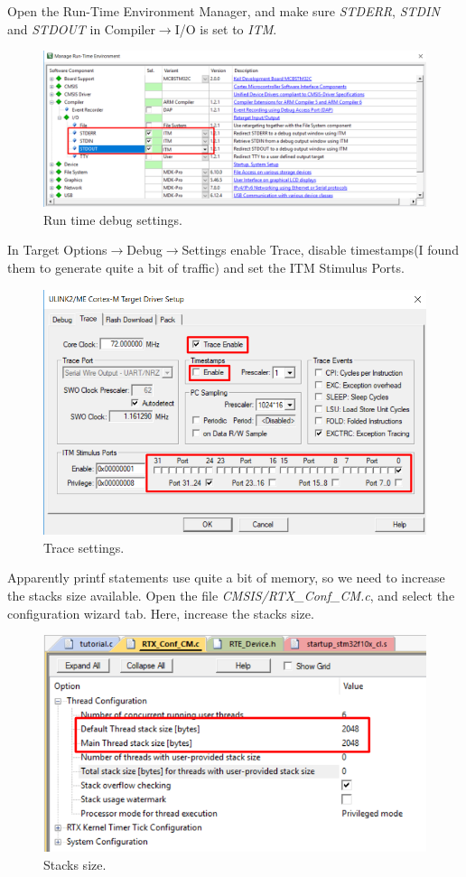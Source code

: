 \documentclass{article}
\begin{document}
Open the Run-Time Environment Manager, and make sure \textit{STDERR}, \textit{STDIN}
and \textit{STDOUT} in Compiler$\to$I/O is set to \textit{ITM}.
\begin{figure}[H]
    \centering
    \includegraphics[width=0.8\linewidth]{pics/RuntimeDebug.png}
    \caption{Run time debug settings.}
    \label{fig:Run time debug settings}
\end{figure}

\newpage

In Target Options$\to$Debug$\to$Settings enable Trace, disable timestamps(I found them to generate quite a bit of traffic)
and set the ITM Stimulus Ports.
\begin{figure}[H]
    \centering
    \includegraphics[width=0.8\linewidth]{pics/TraceSetup.png}
    \caption{Trace settings.}
    \label{fig:TraceSettings}
\end{figure}

Apparently printf statements use quite a bit of memory, so we need to increase the stacks size available.
Open the file \textit{CMSIS/RTX\_Conf\_CM.c}, and select the configuration wizard tab.
Here, increase the stacks size.
\begin{figure}[H]
    \centering
    \includegraphics[width=0.8\linewidth]{pics/ThreadStackSize.png}
    \caption{Stacks size.}
    \label{fig:StackSize}
\end{figure}
\end{document}
